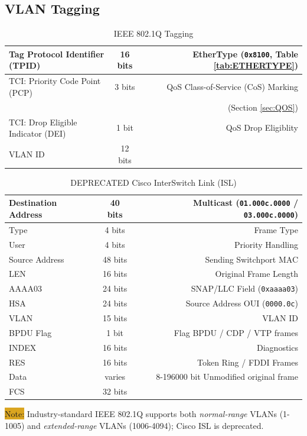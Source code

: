 \documentclass[12pt]{article}
\newcommand{\note}[1]{\colorbox{#1}{Note:}}
\begin{document}
	\subsection{VLAN Tagging \label{subsec:VLAN TAGGING}}
	\begin{table}[H]
	\centering
	\caption{IEEE 802.1Q Tagging \label{tab:802.1Q}}
	\begin{tabular}{| l | c | r |}
	\hline
	Tag Protocol Identifier (TPID)		& 16 bits	& EtherType (\texttt{0x8100}, Table \ref{tab:ETHERTYPE})\\\hline
	TCI: Priority Code Point (PCP)		& 3 bits	& QoS Class-of-Service (CoS) Marking\\
							&		& (Section \ref{sec:QOS})\\\hline
	TCI: Drop Eligible Indicator (DEI)	& 1 bit 	& QoS Drop Eligiblity\\\hline
	VLAN ID 					& 12 bits	&\\\hline
	\end{tabular}\end{table}

	\begin{table}[H]
	\centering
	\caption{DEPRECATED Cisco InterSwitch Link (ISL) \label{tab:CISCO ISL}}
	\begin{tabular}{| l | c | r |}
	\hline
	Destination Address	& 40 bits	& Multicast (\texttt{01.000c.0000} / \texttt{03.000c.0000})\\\hline
	Type				& 4 bits	& Frame Type\\\hline
	User				& 4 bits	& Priority Handling\\\hline
	Source Address		& 48 bits	& Sending Switchport MAC\\\hline
	LEN				& 16 bits	& Original Frame Length\\\hline
	AAAA03			& 24 bits	& SNAP/LLC Field (\texttt{0xaaaa03})\\\hline
	HSA				& 24 bits	& Source Address OUI (\texttt{0000.0c})\\\hline
	VLAN				& 15 bits	& VLAN ID\\\hline
	BPDU Flag			& 1 bit 	& Flag BPDU / CDP / VTP frames\\\hline
	INDEX			& 16 bits	& Diagnostics\\\hline
	RES				& 16 bits	& Token Ring / FDDI Frames\\\hline
	Data				& varies	& 8-196000 bit Unmodified original frame\\\hline
	FCS				& 32 bits	&\\\hline
	\end{tabular}\end{table}
	\note{Goldenrod} Industry-standard IEEE 802.1Q supports both \textit{normal-range} VLANs (1-1005) and \textit{extended-range} VLANs (1006-4094); Cisco ISL is deprecated.
\end{document}

